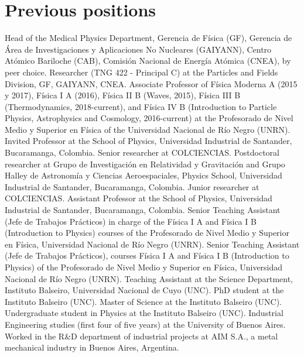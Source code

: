 \vspace{-1cm}
\ifres
\else
\ifeng
\section*{Previous positions}
\noindent
{} Head of the Medical Physics Department, Gerencia de Física (GF), Gerencia de Área de Investigaciones y Aplicaciones No Nucleares (GAIYANN), Centro Atómico Bariloche (CAB), Comisión Nacional de Energía Atómica (CNEA), by peer choice.
 Researcher (TNG 422 - Principal C) at the Particles and Fields Division, GF, GAIYANN, CNEA.
 Associate Professor of Física Moderna A (2015 y 2017), Física I A (2016), Física II B (Waves, 2015), Física III B (Thermodynamics, 2018-current), and Física IV B (Introduction to Particle Physics, Astrophysics and Cosmology, 2016-current) at the Profesorado de Nivel Medio y Superior en Física of the Universidad Nacional de Río Negro (UNRN).
 Invited Professor at the School of Physics, Universidad Industrial de Santander, Bucaramanga, Colombia. Senior researcher at COLCIENCIAS.
 Postdoctoral researcher at Grupo de Investigación en Relatividad y Gravitación and Grupo Halley de Astronomía y Ciencias Aeroespaciales, Physics School, Universidad Industrial de Santander, Bucaramanga, Colombia. Junior researcher at COLCIENCIAS.
 Assistant Professor at the School of Physics, Universidad Industrial de Santander, Bucaramanga, Colombia.
 Senior Teaching Assistant (Jefe de Trabajos Prácticos) in charge of the Física I A and Física I B (Introduction to Physics) courses of the Profesorado de Nivel Medio y Superior en Física, Universidad Nacional de Río Negro (UNRN).
 Senior Teaching Assistant (Jefe de Trabajos Prácticos), courses Física I A and Física I B (Introduction to Physics) of the Profesorado de Nivel Medio y Superior en Física, Universidad Nacional de Río Negro (UNRN).
 Teaching Assistant at the Science Department, Instituto Balseiro, Universidad Nacional de Cuyo (UNC).
 PhD student at the Instituto Balseiro (UNC).
 Master of Science at the Instituto Balseiro (UNC).
 Undergraduate student in Physics at the Instituto Balseiro (UNC).
 Industrial Engineering studies (first four of five years) at the University of Buenos Aires.
 Worked in the R\&D department of industrial projects at AIM S.A., a metal mechanical industry in Buenos Aires, Argentina.

